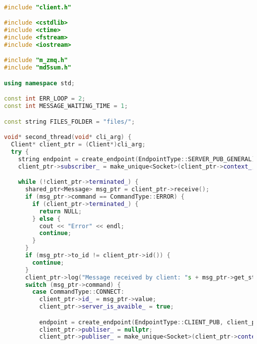 \begin{lstlisting}[language=C++]

#include "client.h"

#include <cstdlib>
#include <ctime>
#include <fstream>
#include <iostream>

#include "m_zmq.h"
#include "md5sum.h"

using namespace std;

const int ERR_LOOP = 2;
const int MESSAGE_WAITING_TIME = 1;

const string FILES_FOLDER = "files/";

void* second_thread(void* cli_arg) {
  Client* client_ptr = (Client*)cli_arg;
  try {
    string endpoint = create_endpoint(EndpointType::SERVER_PUB_GENERAL);
    client_ptr->subscriber_ = make_unique<Socket>(client_ptr->context_, SocketType::SUBSCRIBER, move(endpoint));

    while (!client_ptr->terminated_) {
      shared_ptr<Message> msg_ptr = client_ptr->receive();
      if (msg_ptr->command == CommandType::ERROR) {
        if (client_ptr->terminated_) {
          return NULL;
        } else {
          cout << "Error" << endl;
          continue;
        }
      }
      if (msg_ptr->to_id != client_ptr->id()) {
        continue;
      }
      client_ptr->log("Message received by client: "s + msg_ptr->get_stats());
      switch (msg_ptr->command) {
        case CommandType::CONNECT:
          client_ptr->id_ = msg_ptr->value;
          client_ptr->server_is_avaible_ = true;

          endpoint = create_endpoint(EndpointType::CLIENT_PUB, client_ptr->id());
          client_ptr->publiser_ = nullptr;
          client_ptr->publiser_ = make_unique<Socket>(client_ptr->context_, SocketType::PUBLISHER, move(endpoint));


\end{lstlisting}

